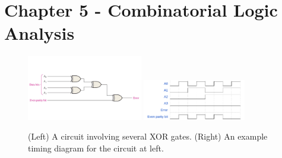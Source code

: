 \documentclass[10pt]{article}
\begin{document}
\maketitle

\section{Chapter 5 - Combinatorial Logic Analysis}
\label{sec:comb}

\begin{figure}[ht]
\centering
\includegraphics[width=0.45\textwidth,trim=0cm 4cm 0cm 4cm,clip=true]{figures/parityCheck.pdf} \hspace{0.25cm}
\includegraphics[width=0.4\textwidth]{figures/timingExample9.pdf}
\caption{\label{fig:par} (Left) A circuit involving several XOR gates. (Right) An example timing diagram for the circuit at left.}
\end{figure}
\end{document}
